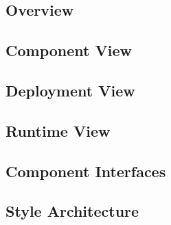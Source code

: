 \subsection{Overview}

\subsection{Component View}

\subsection{Deployment View}

\subsection{Runtime View}

\subsection{Component Interfaces}

\subsection{Style Architecture}

